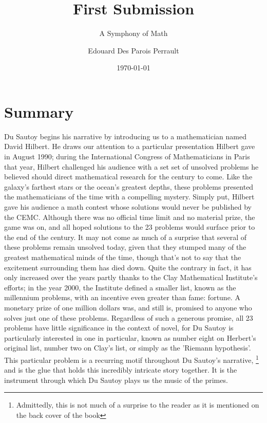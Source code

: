 \documentclass{mathbook}
\title{First Submission}
\author{Edouard Des Parois Perrault}
\date{\today}
\subtitle{A Symphony of Math}
\begin{document}
    \maketitle
    \onehalfspacing
    \section{Summary}
    Du Sautoy begins his narrative by introducing us to a mathematician named David Hilbert. He draws our attention to a particular presentation Hilbert gave in August 1990; during the International Congress of Mathematicians in Paris that year, Hilbert challenged his audience with a set set of unsolved problems he believed should direct mathematical research for the century to come. Like the galaxy's farthest stars or the ocean's greatest depths, these problems presented the mathematicians of the time with a compelling mystery. Simply put, Hilbert gave his audience a math contest whose solutions would never be published by the CEMC. Although there was no official time limit and no material prize, the game was on, and all hoped solutions to the 23 problems would surface prior to the end of the century. \cite{2011} It may not come as much of a surprise that several of these problems remain unsolved today, given that they stumped many of the greatest mathematical minds of the time, though that's not to say that the excitement surrounding them has died down. Quite the contrary in fact, it has only increased over the years partly thanks to the Clay Mathematical Institute's efforts; in the year 2000, the Institute defined a smaller list, known as the millennium problems, with an incentive even greater than fame: fortune. A monetary prize of one million dollars was, and still is, promised to anyone who solves just one of these problems. \cite[p.~15]{Sautoy2003} Regardless of such a generous promise, all 23 problems have little significance in the context of novel, for Du Sautoy is particularly interested in one in particular, known as number eight on Herbert's original list, number two on Clay's list, or simply as the 'Riemann hypothesis'. \cite[p.~1]{Sautoy2003} This particular problem is a recurring motif throughout Du Sautoy's narrative, \footnote{Admittedly, this is not much of a surprise to the reader as it is mentioned on the back cover of the book} and is the glue that holds this incredibly intricate story together. It is the instrument through which Du Sautoy plays us the music of the primes. 
\end{document}
